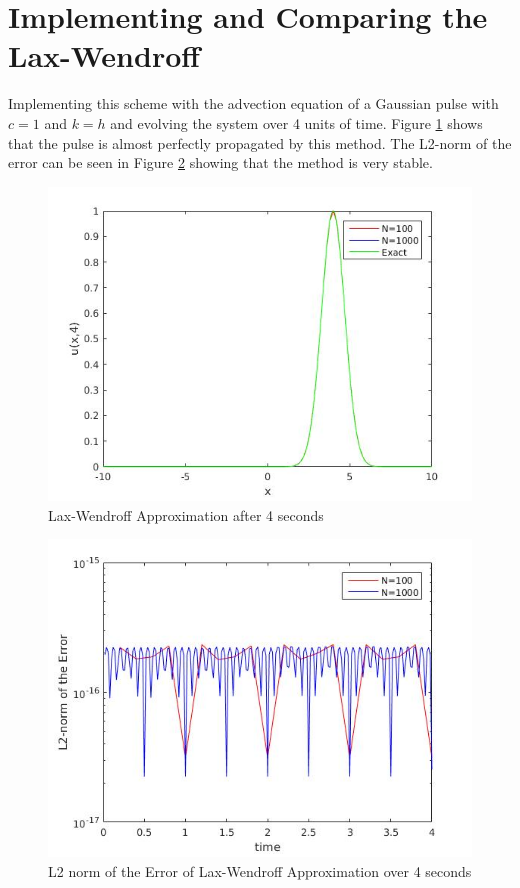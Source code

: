 \section{Implementing and Comparing the Lax-Wendroff}
Implementing this scheme with the advection equation of a Gaussian pulse with $c=1$ and $k=h$ and evolving the system over 4 units of time. Figure \ref{laxwen_adv} shows that the pulse is almost perfectly propagated by this method. The L2-norm of the error can be seen in Figure \ref{laxwen_adv_l2} showing that the method is very stable.
\begin{figure}[H]
 \centering
 \includegraphics[scale=0.5]{Images/lw_adv_4.jpg}
 \caption{Lax-Wendroff Approximation after 4 seconds}
 \label{laxwen_adv}
\end{figure}
\begin{figure}[H]
 \centering
 \includegraphics[scale=0.5]{Images/lw_adv_4_l2.jpg}
 \caption{L2 norm of the Error of Lax-Wendroff Approximation over 4 seconds}
 \label{laxwen_adv_l2}
\end{figure}

